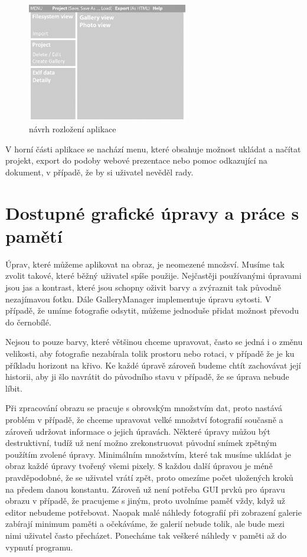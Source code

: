 \documentclass[11pt,twoside,a4paper]{book}
\begin{document}
\begin{figure}[ht]
\begin{center}
\includegraphics[width=7cm]{figures/layout}
\caption{návrh rozložení aplikace}
\label{fig:layout}
\end{center}
\end{figure}

\indent
V horní části aplikace se nachází menu, které obsahuje možnost ukládat a načítat projekt, export do podoby webové prezentace nebo pomoc odkazující na dokument, v případě, že by si uživatel nevěděl rady.

\section{Dostupné grafické úpravy a práce s pamětí}
\noindent
Úprav, které můžeme aplikovat na obraz, je neomezené množsví. Musíme tak zvolit takové, které běžný uživatel spíše použije. Nejčastěji používanými úpravami jsou jas a kontrast, které jsou schopny oživit barvy a zvýraznit tak původně nezajímavou fotku. Dále GalleryManager implementuje úpravu sytosti. V případě, že umíme fotografie odsytit, můžeme jednoduše přidat možnost převodu do černobílé.

\indent
Nejsou to pouze barvy, které většinou chceme upravovat, často se jedná i o změnu velikosti, aby fotografie nezabírala tolik prostoru nebo rotaci, v případě že je ku příkladu horizont na křivo. Ke každé úpravě zároveň budeme chtít zachovávat její historii, aby ji šlo navrátit do původního stavu v případě, že se úprava nebude líbit.

\indent
Při zpracování obrazu se pracuje s obrovským množstvím dat, proto nastává problém v případě, že chceme upravovat velké množství fotografií současně a zároveň udržovat informace o jejich úpravách. Některé úpravy můžou být destruktivní, tudíž už není možno zrekonstruovat původní snímek zpětným použítím zvolené úpravy. Minimálním množstvím, které tak musíme ukládat je obraz každé úpravy tvořený všemi pixely. S každou další úpravou je méně pravděpodobné, že se uživatel vrátí zpět, proto omezíme počet uložených kroků na předem danou konstantu. Zároveň už není potřeba GUI prvků pro úpravu obrazu v případě, že pracujeme s jiným, proto uvolníme paměť vždy, když už editor nebudeme potřebovat. Naopak malé náhledy fotografií při zobrazení galerie zabírají minimum paměti a očekáváme, že galerií nebude tolik, ale bude mezi nimi uživatel často přecházet. Ponecháme tak veškeré náhledy v paměti až do vypnutí programu.
\end{document}
